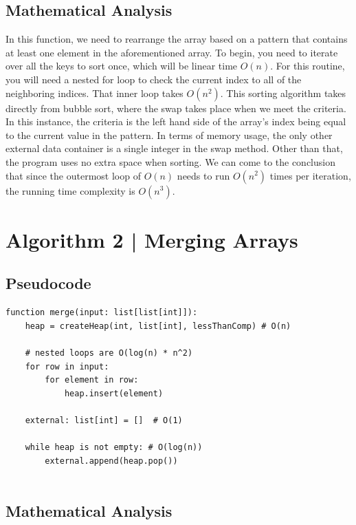 \documentclass{article}
\begin{document}
\subsection{Mathematical Analysis}

In this function, we need to rearrange the array based on a pattern that contains at least one element in the aforementioned array.
To begin, you need to iterate over all the keys to sort once, which will be linear time $O(n)$.
For this routine, you will need a nested for loop to check the current index to all of the neighboring indices. That inner loop takes $O(n^{2})$.
This sorting algorithm takes directly from bubble sort, where the swap takes place when we meet the criteria.
In this instance, the criteria is the left hand side of the array's index being equal to the current value in the pattern.
In terms of memory usage, the only other external data container is a single integer in the swap method. Other than that, the program uses no extra space when sorting.
We can come to the conclusion that since the outermost loop of $O(n)$ needs to run $O(n^{2})$ times per iteration, the running time complexity is $O(n^{3})$.

\newpage

\section{Algorithm 2 | Merging Arrays}

\subsection{Pseudocode}

\begin{verbatim}
function merge(input: list[list[int]]):
    heap = createHeap(int, list[int], lessThanComp) # O(n)

    # nested loops are O(log(n) * n^2)
    for row in input: 
        for element in row:
            heap.insert(element)

    external: list[int] = []  # O(1)

    while heap is not empty: # O(log(n))
        external.append(heap.pop())
        
\end{verbatim}

\subsection{Mathematical Analysis}
\end{document}
